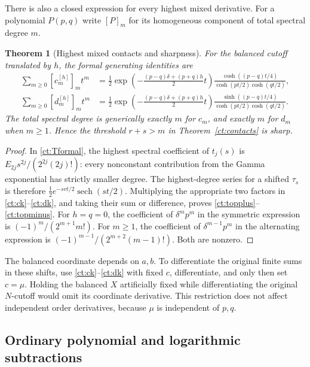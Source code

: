 \documentclass[11pt,letterpaper]{article}
\numberwithin{equation}{section}
\newtheorem{theorem}{Theorem}[section]
\theoremstyle{definition}
\theoremstyle{remark}
\begin{document}
There is also a closed expression for every highest mixed derivative.
For a polynomial $P(p,q)$ write $[P]_m$ for its homogeneous component of
total spectral degree $m$.

\begin{theorem}[Highest mixed contacts and sharpness]\label{ct:top}
For the balanced cutoff translated by $h$, the formal generating identities
are
\begin{align}
 \sum_{m\ge0}[c_m^{[h]}]_m t^m
 &=\frac12\exp\left(-\frac{(p-q)\delta+(p+q)h}{2}t\right)
 \frac{\cosh((p-q)t/4)}{\cosh(pt/2)\cosh(qt/2)},\label{ct:topplus}\\
 \sum_{m\ge0}[d_m^{[h]}]_m t^m
 &=\frac12\exp\left(-\frac{(p-q)\delta+(p+q)h}{2}t\right)
 \frac{\sinh((p-q)t/4)}{\cosh(pt/2)\cosh(qt/2)}.\label{ct:topminus}
\end{align}
The total spectral degree is generically exactly $m$ for $c_m$, and
exactly $m$ for $d_m$ when $m\ge1$. Hence the threshold $r+s>m$ in
Theorem~\ref{ct:contacts} is sharp.
\end{theorem}
\begin{proof}
In \eqref{ct:Tformal}, the highest spectral coefficient of $t_j(s)$ is
$E_{2j}s^{2j}/(2^{2j}(2j)!)$: every nonconstant contribution from the
Gamma exponential has strictly smaller degree. The highest-degree
series for a shifted $\tau_s$ is therefore
$\tfrac12 e^{-svt/2}\operatorname{sech}(st/2)$. Multiplying the
appropriate two factors in \eqref{ct:ck}--\eqref{ct:dk}, and taking
their sum or difference, proves \eqref{ct:topplus}--\eqref{ct:topminus}.
For $h=q=0$, the coefficient of $\delta^mp^m$ in the symmetric
expression is $(-1)^m/(2^{m+1}m!)$. For $m\ge1$, the coefficient
of $\delta^{m-1}p^m$ in the alternating expression is
$(-1)^{m-1}/(2^{m+2}(m-1)!)$. Both are nonzero.
\end{proof}

The balanced coordinate depends on $a,b$. To differentiate the original
finite sums in these shifts, use \eqref{ct:ck}--\eqref{ct:dk} with fixed
$c$, differentiate, and only then set $c=\mu$. Holding the balanced $X$
artificially fixed while differentiating the original $N$-cutoff would
omit its coordinate derivative. This restriction does not affect
independent order derivatives, because $\mu$ is independent of $p,q$.

\subsection{Ordinary polynomial and logarithmic subtractions}
\end{document}
